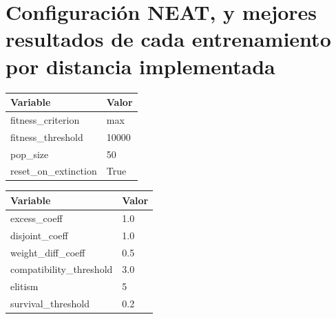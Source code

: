 \documentclass[conference]{IEEEtran}
\begin{document}
\section{Configuración NEAT, y mejores resultados de cada entrenamiento por distancia implementada}
\renewcommand{\thetable}{S\arabic{table}T}
\begin{table}[H]
    \centering
    \label{tab:NEAT}
    \begin{tabular}{ll}
    \toprule
    \textbf{Variable} & \textbf{Valor} \\
    \midrule
    fitness\_criterion     & max \\
    fitness\_threshold     & 10000 \\
    pop\_size              & 50 \\
    reset\_on\_extinction  & True  \\
    \bottomrule
    \end{tabular}
    \vspace{0.5cm}
    
    \centering
    \label{tab:DefaultReproduction}
    \begin{tabular}{ll}
    \toprule
    \textbf{Variable} & \textbf{Valor} \\
    \midrule
    excess\_coeff            & 1.0 \\
    disjoint\_coeff          & 1.0 \\
    weight\_diff\_coeff      & 0.5 \\
    compatibility\_threshold & 3.0 \\
    elitism                  & 5 \\
    survival\_threshold      & 0.2 \\
    \bottomrule
    \end{tabular}
    \vspace{0.5cm}
\end{table}
\end{document}
